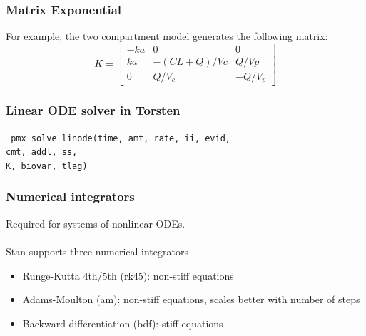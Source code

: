 \documentclass[xcolor=table]{beamer}
\begin{document}
\begin{frame}
  \frametitle{Matrix Exponential}

  For example, the two compartment model generates the following matrix:
  \[ K = \begin{bmatrix}
       -ka & 0 & 0 \\
       ka & - (CL + Q) / Vc & Q / Vp \\
       0 & Q / V_c & - Q / V_p
     \end{bmatrix}
  \]
  
\end{frame}

\begin{frame}
  \frametitle{Linear ODE solver in Torsten}

    \texttt{
    pmx\_solve\_\textcolor{MRGGreen}{linode}(time, amt, rate, ii, evid, \\ 
    \hspace{3.3cm} cmt, addl, ss, \\
     \hspace{3.3cm} \textcolor{MRGGreen}{K}, biovar, tlag)
   }

\end{frame}

\begin{frame}
  \frametitle{Numerical integrators}

  Required for systems of nonlinear ODEs. \\ \ \\

  Stan supports three numerical integrators
  \begin{itemize}
    \item Runge-Kutta 4th/5th (rk45): non-stiff equations
    \item Adams-Moulton (am): non-stiff equations, scales better with number of steps
    \item Backward differentiation (bdf): stiff equations
  \end{itemize}
  
\end{frame}
\end{document}
